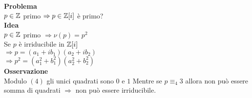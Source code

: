 \documentclass[12px]{article}
\begin{document}
	       \textbf{Problema}\\
	       $p\in \mathbb{Z}$ primo  $ \Rightarrow p\in \mathbb{Z}[i] $ è primo?\\
	        \textbf{Idea}\\
		$p\in\mathbb{Z}$ primo  $ \Rightarrow \nu(p) = p^2$ \\
		Se $p$ è irriducibile in $\mathbb{Z}[i]$\\
		 $ \Rightarrow p= (a_1+ib_1)(a_2 + ib_2)$\\
		 $ \Rightarrow p^2 = (a^2_1 + b_1^2)(a_2^2+b_2^2)$ \\
		 \textbf{Osservazione}\\
		 Modulo $(4)$ gli unici quadrati sono  $0$ e $1$ Mentre se  $p\equiv_4 3$ allora non può essere somma di quadrati $ \Rightarrow  $ non può essere irriducibile.
\end{document}
